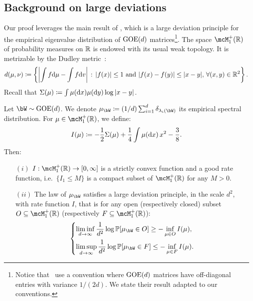 \subsection{Background on large deviations}

\myskip 
Our proof leverages the main result of \cite{arous1997large}, which is a large deviation principle for the empirical eigenvalue distribution of $\mathrm{GOE}(d)$ matrices\footnote{
    Notice that~\cite{arous1997large} use a convention where $\mathrm{GOE}(d)$ matrices have off-diagonal entries with variance $1/(2d)$. We state their result adapted to our conventions.
}.
The space $\mcM_1^+(\bbR)$ of probability measures on $\mathbb{R}$ is endowed with its usual weak topology. 
It is metrizable by the Dudley metric~\citep{bogachev2007measure}:
\begin{equation}
    \label{eq:dudley}
    d(\mu, \nu) \coloneqq \left\{\left|\int f \mathrm{d} \mu - \int f \mathrm{d} v\right| \, : \, |f(x)| \leq 1 \textrm{ and } |f(x) - f(y)| \leq |x - y|, \, \forall (x, y) \in \mathbb{R}^2\right\}.
\end{equation}
Recall that $\Sigma(\mu) \coloneqq \int \mu(\mathrm{d} x) \mu(\mathrm{d} y) \log |x-y|$.
\begin{proposition}\label{prop:ldp_emeasure}
    Let $\bW \sim \GOE(d)$. 
    We denote $\mu_{\bW} \coloneqq (1/d) \sum_{i=1}^d \delta_{\lambda_i(\bW)}$ its empirical spectral distribution. 
    For $\mu \in \mcM_1^+(\bbR)$, we define: 
    \begin{equation}
        \label{eq:def_I}
        I(\mu) \coloneqq -\frac{1}{2} \Sigma(\mu) + \frac{1}{4} \int \mu(\mathrm{d} x) \, x^2 - \frac{3}{8}.
    \end{equation}
    Then: 
    \begin{itemize}
        \item[$(i)$] $I : \mcM_1^+(\bbR) \to [0, \infty]$ is a strictly convex function and a good rate function, i.e.\  
        $\{I_1 \leq M\}$ is a compact subset of $\mcM_1^+(\bbR)$ for any $M > 0$.
        \item[$(ii)$]
        The law of $\mu_\bW$ satisfies a large deviation principle, in the scale $d^2$, with rate function $I$, that is for any 
        open (respectively closed) subset $O \subseteq \mcM_1^+(\bbR)$ (respectively $F \subseteq \mcM_1^+(\bbR)$): 
        \begin{equation*}
            \begin{dcases}
                \liminf_{d\to\infty} \frac{1}{d^2} \log \bbP[\mu_\bW \in O] \geq - \inf_{\mu \in O} I(\mu), \\
                \limsup_{d\to\infty} \frac{1}{d^2} \log \bbP[\mu_\bW \in F] \leq - \inf_{\mu \in F} I(\mu).
            \end{dcases}
        \end{equation*}
    \end{itemize}
\end{proposition}

